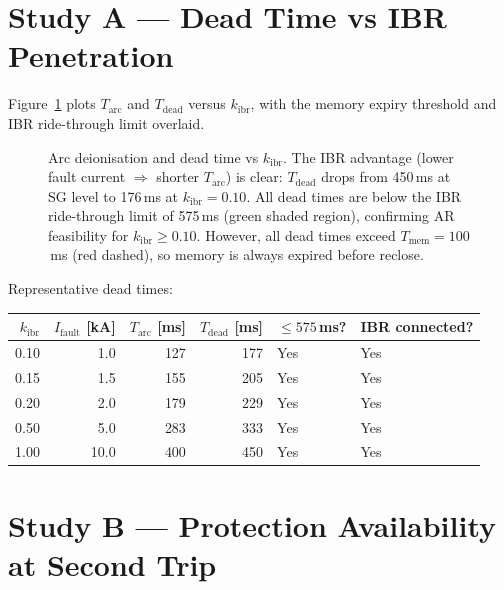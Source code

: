 \documentclass[11pt,a4paper]{article}
\begin{document}
\section{Study A --- Dead Time vs IBR Penetration}
\label{sec:studyA}

Figure~\ref{fig:tdead} plots $T_\mathrm{arc}$ and $T_\mathrm{dead}$ versus
$k_\mathrm{ibr}$, with the memory expiry threshold and IBR ride-through limit
overlaid.

\begin{figure}[htbp]
  \centering
  \resizebox{0.85\textwidth}{!}{}
  \caption{Arc deionisation and dead time vs $k_\mathrm{ibr}$.  The IBR
           advantage (lower fault current $\Rightarrow$ shorter $T_\mathrm{arc}$)
           is clear: $T_\mathrm{dead}$ drops from 450\,ms at SG level to
           176\,ms at $k_\mathrm{ibr}=0.10$.  All dead times are below the
           IBR ride-through limit of 575\,ms (green shaded region), confirming
           AR feasibility for $k_\mathrm{ibr}\geq0.10$.  However, all dead times
           exceed $T_\mathrm{mem}=100$\,ms (red dashed), so memory is always
           expired before reclose.}
  \label{fig:tdead}
\end{figure}

\noindent
Representative dead times:
\begin{center}
\begin{tabular}{@{}rrrrll@{}}
\toprule
$k_\mathrm{ibr}$ & $I_\mathrm{fault}$ [kA] & $T_\mathrm{arc}$ [ms] &
  $T_\mathrm{dead}$ [ms] & $\leq575$\,ms? & IBR connected?\\
\midrule
0.10 & 1.0 & 127 & 177 & Yes & Yes\\
0.15 & 1.5 & 155 & 205 & Yes & Yes\\
0.20 & 2.0 & 179 & 229 & Yes & Yes\\
0.50 & 5.0 & 283 & 333 & Yes & Yes\\
1.00 & 10.0 & 400 & 450 & Yes & Yes\\
\bottomrule
\end{tabular}
\end{center}

\section{Study B --- Protection Availability at Second Trip}
\label{sec:studyB}
\end{document}
